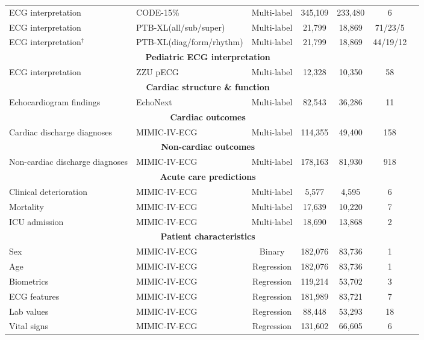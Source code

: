 \documentclass{article}
\begin{document}
\begin{table}[htbp]
\begin{tabular}{llccccc}
                ECG interpretation & CODE-15\% &Multi-label& 345,109 & 233,480 & 6 \\
                ECG interpretation & PTB-XL(all/sub/super) &Multi-label & 21,799 & 18,869 &71/23/5 \\
                ECG interpretation${}^\dagger$  & PTB-XL(diag/form/rhythm) & Multi-label & 21,799 & 18,869 &44/19/12 \\
                \midrule
                \multicolumn{6}{c}{\textbf{Pediatric ECG interpretation }} \\
                ECG interpretation & ZZU pECG& Multi-label & 12,328 & 10,350 & 58 \\
                \midrule
                \multicolumn{6}{c}{\textbf{Cardiac structure \& function }} \\
                Echocardiogram findings &EchoNext&Multi-label & 82,543 & 36,286 &11   \\
                \midrule
                \multicolumn{6}{c}{\textbf{Cardiac outcomes }} \\
                Cardiac discharge diagnoses & MIMIC-IV-ECG &Multi-label& 114,355 & 49,400 & 158 \\
                \midrule
                \multicolumn{6}{c}{\textbf{Non-cardiac outcomes }}\\
                Non-cardiac discharge diagnoses & MIMIC-IV-ECG &Multi-label& 178,163 & 81,930 & 918 \\
                \midrule
                \multicolumn{6}{c}{\textbf{Acute care predictions }} \\
                Clinical deterioration & MIMIC-IV-ECG &Multi-label & 5,577 & 4,595 & 6 \\
                Mortality & MIMIC-IV-ECG &Multi-label& 17,639 & 10,220 & 7  \\
                ICU admission & MIMIC-IV-ECG &Multi-label& 18,690 & 13,868 & 2 \\
                \midrule
                \multicolumn{6}{c}{\textbf{Patient characteristics }}\\
                Sex & MIMIC-IV-ECG &Binary& 182,076 & 83,736 & 1 \\
                Age & MIMIC-IV-ECG &Regression& 182,076 & 83,736 & 1 \\
                Biometrics & MIMIC-IV-ECG &Regression & 119,214 & 53,702 & 3 \\
                ECG features & MIMIC-IV-ECG &Regression & 181,989 & 83,721 & 7 \\
                Lab values & MIMIC-IV-ECG &Regression& 88,448 & 53,293 & 18 \\
                Vital signs & MIMIC-IV-ECG  & Regression & 131,602 & 66,605 & 6 \\
                \bottomrule
            \end{tabular}
            \label{tab:datasets_blank}
        \end{table}
\end{document}
